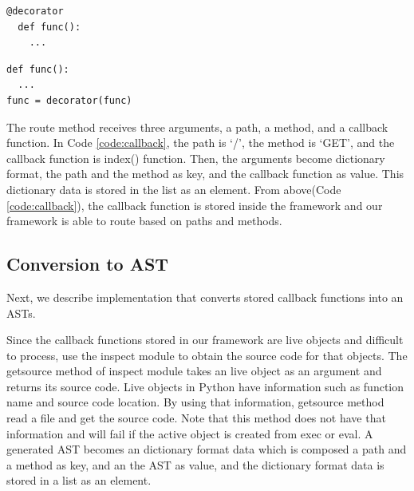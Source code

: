 \documentclass[conference]{IEEEtran}
\begin{document}
\begin{lstlisting}[caption={Python decorator.}, label=code:decorator, captionpos=b]
@decorator
  def func():
    ...
\end{lstlisting}

\begin{lstlisting}[caption={Source code synonymous with Code \ref{code:decorator}.}, captionpos=b]
def func():
  ...
func = decorator(func)
\end{lstlisting}

The route method receives three arguments, a path, a method, and a callback function.
In Code \ref{code:callback}, the path is `/', the method is `GET', and the callback function is index() function.
Then, the arguments become dictionary format, the path and the method as key, and the callback function as value.
This dictionary data is stored in the list as an element.
From above(Code \ref{code:callback}), the callback function is stored inside the framework and our framework is able to route based on paths and methods.

\subsection{Conversion to AST}
Next, we describe implementation that converts stored callback functions into an ASTs.

Since the callback functions stored in our framework are live objects and difficult to process, use the inspect module to obtain the source code for that objects.
The getsource method of inspect module takes an live object as an argument and returns its source code.
Live objects in Python have information such as function name and source code location.
By using that information, getsource method read a file and get the source code.
Note that this method does not have that information and will fail if the active object is created from exec or eval.
A generated AST becomes an dictionary format data which is composed a path and a method as key, and an the AST as value, and the dictionary format data is stored in a list as an element.
\end{document}
